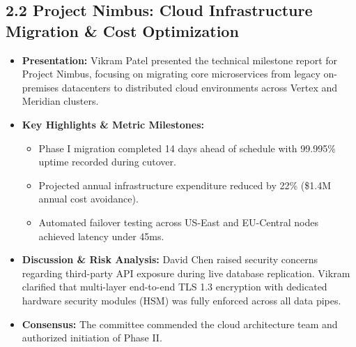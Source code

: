 \documentclass[11pt,a4paper]{article}
\begin{document}
\subsection{2.2 Project Nimbus: Cloud Infrastructure Migration \& Cost Optimization}
\begin{itemize}[leftmargin=15pt, itemsep=2.5pt]
    \item \textbf{Presentation:} Vikram Patel presented the technical milestone report for Project Nimbus, focusing on migrating core microservices from legacy on-premises datacenters to distributed cloud environments across Vertex and Meridian clusters.
    \item \textbf{Key Highlights \& Metric Milestones:}
    \begin{itemize}[leftmargin=12pt, itemsep=1.5pt]
        \item Phase I migration completed 14 days ahead of schedule with 99.995\% uptime recorded during cutover.
        \item Projected annual infrastructure expenditure reduced by 22\% (\$1.4M annual cost avoidance).
        \item Automated failover testing across US-East and EU-Central nodes achieved latency under 45ms.
    \end{itemize}
    \item \textbf{Discussion \& Risk Analysis:}
    David Chen raised security concerns regarding third-party API exposure during live database replication. Vikram clarified that multi-layer end-to-end TLS 1.3 encryption with dedicated hardware security modules (HSM) was fully enforced across all data pipes.
    \item \textbf{Consensus:} The committee commended the cloud architecture team and authorized initiation of Phase II.
\end{itemize}
\end{document}
